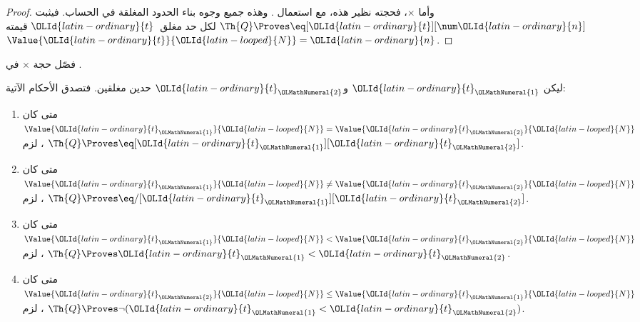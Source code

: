 \documentclass[../../../include/open-logic-section]{subfiles}
\begin{document}
\begin{proof}
وأما $\times$، فحجته نظير هذه، مع استعمال
.
%
وهذه جميع وجوه بناء الحدود المغلقة في الحساب. فيثبت
$\Th{Q}\Proves\eq[\OLId{latin-ordinary}{t}][\num \OLId{latin-ordinary}{n}]$ لكل حد مغلق~$\OLId{latin-ordinary}{t}$ قيمته
$\Value{\OLId{latin-ordinary}{t}}{\OLId{latin-looped}{N}}=\OLId{latin-ordinary}{n}$.
\end{proof}

\begin{prob}
فصّل حجة $\times$ في
.
\end{prob}

\begin{lem}
ليكن $\OLId{latin-ordinary}{t}_\OLMathNumeral{1}$ و$\OLId{latin-ordinary}{t}_\OLMathNumeral{2}$ حدين مغلقين. فتصدق الأحكام الآتية:
\begin{enumerate}
\item متى كان $\Value{\OLId{latin-ordinary}{t}_\OLMathNumeral{1}}{\OLId{latin-looped}{N}}=\Value{\OLId{latin-ordinary}{t}_\OLMathNumeral{2}}{\OLId{latin-looped}{N}}$،
    لزم $\Th{Q}\Proves\eq[\OLId{latin-ordinary}{t}_\OLMathNumeral{1}][\OLId{latin-ordinary}{t}_\OLMathNumeral{2}]$.
\item متى كان $\Value{\OLId{latin-ordinary}{t}_\OLMathNumeral{1}}{\OLId{latin-looped}{N}}\neq\Value{\OLId{latin-ordinary}{t}_\OLMathNumeral{2}}{\OLId{latin-looped}{N}}$،
    لزم $\Th{Q}\Proves\eq/[\OLId{latin-ordinary}{t}_\OLMathNumeral{1}][\OLId{latin-ordinary}{t}_\OLMathNumeral{2}]$.
\item متى كان $\Value{\OLId{latin-ordinary}{t}_\OLMathNumeral{1}}{\OLId{latin-looped}{N}}<\Value{\OLId{latin-ordinary}{t}_\OLMathNumeral{2}}{\OLId{latin-looped}{N}}$،
    لزم $\Th{Q}\Proves \OLId{latin-ordinary}{t}_\OLMathNumeral{1}<\OLId{latin-ordinary}{t}_\OLMathNumeral{2}$.
\item متى كان $\Value{\OLId{latin-ordinary}{t}_\OLMathNumeral{2}}{\OLId{latin-looped}{N}}\leq\Value{\OLId{latin-ordinary}{t}_\OLMathNumeral{1}}{\OLId{latin-looped}{N}}$،
    لزم $\Th{Q}\Proves\lnot(\OLId{latin-ordinary}{t}_\OLMathNumeral{1}<\OLId{latin-ordinary}{t}_\OLMathNumeral{2})$.
\end{enumerate}
\end{lem}
\end{document}
